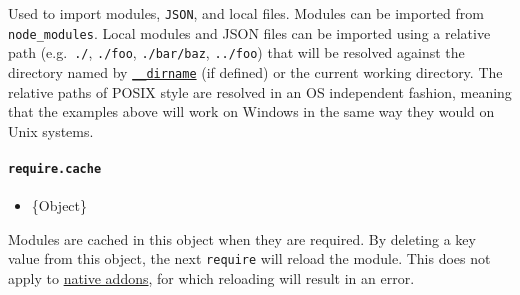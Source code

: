 Used to import modules, \texttt{JSON}, and local files. Modules can be
imported from \texttt{node\_modules}. Local modules and JSON files can
be imported using a relative path (e.g.~\texttt{./}, \texttt{./foo},
\texttt{./bar/baz}, \texttt{../foo}) that will be resolved against the
directory named by \hyperref[__dirname]{\texttt{\_\_dirname}} (if
defined) or the current working directory. The relative paths of POSIX
style are resolved in an OS independent fashion, meaning that the
examples above will work on Windows in the same way they would on Unix
systems.

\begin{Shaded}
\begin{Highlighting}[]
\OperatorTok{=} \NormalTok{(}\NormalTok{)}\OperatorTok{;}

\OperatorTok{=} \NormalTok{(}\NormalTok{)}\OperatorTok{;}

\OperatorTok{=} \NormalTok{(}\NormalTok{)}\OperatorTok{;}
\end{Highlighting}
\end{Shaded}

\paragraph{\texorpdfstring{\texttt{require.cache}}{require.cache}}\label{require.cache}

\begin{itemize}
\tightlist
\item
  \{Object\}
\end{itemize}

Modules are cached in this object when they are required. By deleting a
key value from this object, the next \texttt{require} will reload the
module. This does not apply to \href{addons.md}{native addons}, for
which reloading will result in an error.

